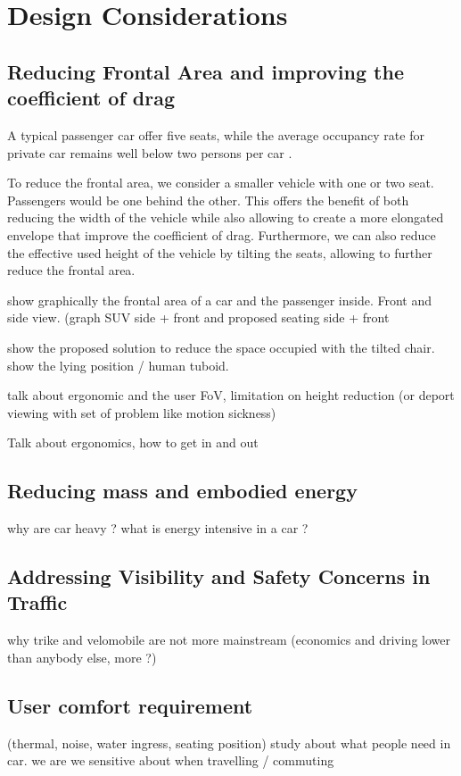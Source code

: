 \section{Design Considerations}

\subsection{Reducing Frontal Area and improving the coefficient of drag}

A typical passenger car offer five seats, while the average occupancy rate for private car remains well below two persons per car \cite{ceu_move_study_2022}.

To reduce the frontal area, we consider a smaller vehicle with one or two seat. Passengers would be one behind the other. This offers the benefit of both reducing the width of the vehicle while also allowing to create a more elongated envelope that improve the coefficient of drag. Furthermore, we can also reduce the effective used height of the vehicle by tilting the seats, allowing to further reduce the frontal area.

show graphically the frontal area of a car and the passenger inside. Front and side view. (graph SUV side + front and proposed seating side + front

show the proposed solution to reduce the space occupied with the tilted chair. show the lying position / human tuboid.

talk about ergonomic and the user FoV, limitation on height reduction (or deport viewing with set of problem like motion sickness)

Talk about ergonomics, how to get in and out
\subsection{Reducing mass and embodied energy}
why are car heavy ? what is energy intensive in a car ?

\subsection{Addressing Visibility and Safety Concerns in Traffic}

why trike and velomobile are not more mainstream (economics and  driving lower than anybody else, more ?)

\subsection{User comfort requirement}
(thermal, noise, water ingress, seating position)
study about what people need in car. we are we sensitive about when travelling / commuting



